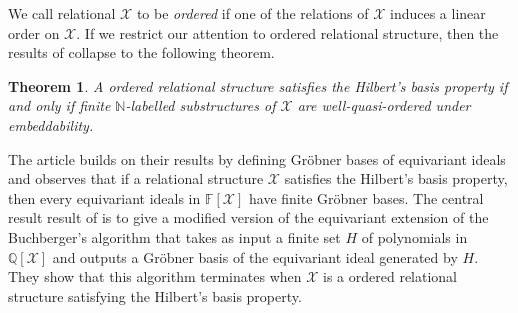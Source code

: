 \documentclass[12pt,a4paper,article]{memoir}
\newcommand{\struct}{\mathcal{X}}
\newcommand{\N}{\mathbb{N}}
\newcommand{\Q}{\mathbb{Q}}
\newcommand{\F}{\mathbb{F}}
\newcommand{\poly}[2]{#1[#2]}
\newcommand{\emphdef}[1]{\emph{\textcolor{BrickRed}{#1}}}
\newtheorem{theorem}{Theorem}
\theoremstyle{definition}
\begin{document}
We call relational $\struct$ to be \emphdef{ordered} if one of the relations of  $\struct$ induces a linear order on $\struct$.
If we restrict our attention to ordered relational structure,
then the results of \cite{GL24} collapse to the following theorem.
%
\begin{theorem}
A ordered relational structure satisfies the Hilbert's basis property if and only if finite $\N$-labelled substructures of $\struct$ are well-quasi-ordered under embeddability.
\end{theorem}
%
The article \cite{GL25} builds on their results by defining Gr\"{o}bner bases of equivariant ideals and observes that if a relational structure $\struct$ satisfies the Hilbert's basis property,
then every equivariant ideals in $\poly{\F}{\struct}$ have finite Gr\"{o}bner bases.
The central result result of \cite{GL25} is to give a modified version of the equivariant extension of the Buchberger's algorithm that takes as input a finite set $H$ of polynomials in $\poly{\Q}{\struct}$ and outputs a Gr\"{o}bner basis of the equivariant ideal generated by $H$.
They show that this algorithm terminates when $\struct$ is a ordered relational structure satisfying the Hilbert's basis property.
%
%
%
%
%
%
%
%
%
%
\end{document}
